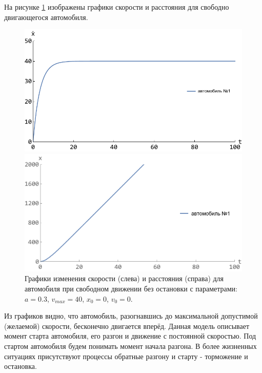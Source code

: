 \documentclass[12pt, a4paper]{extarticle}
\numberwithin{equation}{section}
\numberwithin{figure}{section}
\begin{document}
На рисунке \ref{free_drive_without_stop} изображены графики скорости и расстояния для свободно двигающегося автомобиля.
\begin{figure}[h!]
	\begin{center}
		\begin{minipage}[h!]{0.48\linewidth}
			\includegraphics[width=1\linewidth,height=0.2\textheight]
			{Images/free_drive_speed.pdf}
		\end{minipage}
		\hfill 
		\begin{minipage}[h!]{0.48\linewidth}
			\includegraphics[width=1\linewidth,height=0.2\textheight]
			{Images/free_drive_distance.pdf}
		\end{minipage}
		\caption{Графики изменения скорости (слева) и расстояния (справа) для автомобиля при свободном движении без остановки с параметрами: $a=0.3$, $v_{max}=40$, $x_0=0$, $v_0=0$.}
		\label{free_drive_without_stop}
	\end{center}
\end{figure}

Из графиков видно, что автомобиль, разогнавшись до максимальной допустимой (желаемой) скорости, бесконечно двигается вперёд. Данная модель описывает момент старта автомобиля, его разгон и движение с постоянной скоростью. Под стартом автомобиля будем понимать момент начала разгона. В более жизненных ситуациях присутствуют процессы обратные разгону и старту - торможение и остановка.
\end{document}

